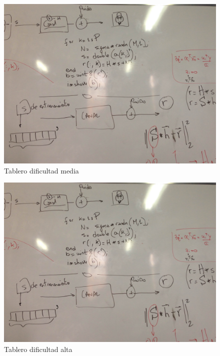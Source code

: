 \documentclass[10pt,journal,compsoc]{IEEEtran}
\begin{document}
\begin{figure}[hp]
\centering
\includegraphics[scale=0.4]{photo1.jpg}
\caption{Tablero dificultad media}
\label{board2}
\end{figure}

\begin{figure}[hp]
\centering
\includegraphics[scale=0.4]{photo1.jpg}
\caption{Tablero dificultad alta}
\label{board3}
\end{figure}
\end{document}
